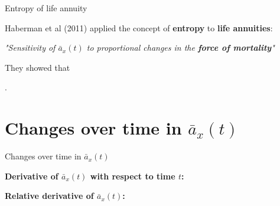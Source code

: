 \documentclass[10pt]{beamer}
\begin{document}
\begin{frame}{Entropy of life annuity}

Haberman et al (2011) applied the concept of \textbf{entropy} to \textbf{life annuities}: \pause

\begin{center}
\end{center}

\begin{center}
\textit{"Sensitivity of $\bar{a}_x(t)$ to proportional changes in the \textbf{force of mortality}"}\pause
\end{center}

They showed that


\begin{center}
	.
\end{center}

\end{frame}




\section{Changes over time in $\bar{a}_x(t)$}


\begin{frame}{Changes over time in $\bar{a}_x(t)$}

\textbf{Derivative of $\bar{a}_x(t)$ with respect to time $t$:}

\begin{center}
	\pause
\end{center}

\textbf{Relative derivative of $\bar{a}_x(t)$:}

\begin{center}
\end{center}

\end{frame}


{
	\begin{frame}[standout]
\end{frame}
}
\end{document}
